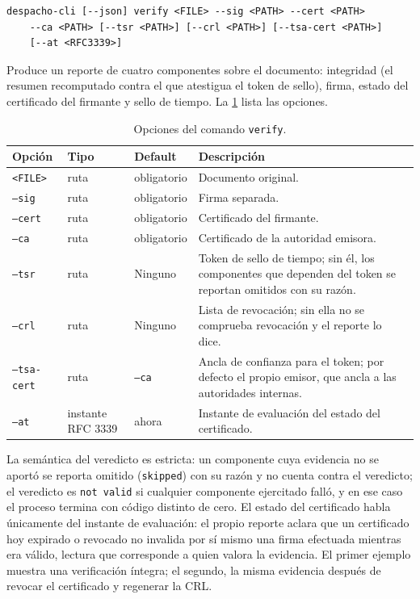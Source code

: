 \begin{lstlisting}[numbers=none]
despacho-cli [--json] verify <FILE> --sig <PATH> --cert <PATH>
    --ca <PATH> [--tsr <PATH>] [--crl <PATH>] [--tsa-cert <PATH>]
    [--at <RFC3339>]
\end{lstlisting}

Produce un reporte de cuatro componentes sobre el documento: integridad (el resumen recomputado contra el que atestigua el token de sello), firma, estado del certificado del firmante y sello de tiempo. La \cref{tab:cli-verify-opciones} lista las opciones.

\begin{table}[H]
  \centering
  \caption{Opciones del comando \texttt{verify}.}
  \label{tab:cli-verify-opciones}
  \begin{tabularx}{\linewidth}{@{}l l l >{\raggedright\arraybackslash}X@{}}
    \toprule
    \textbf{Opción} & \textbf{Tipo} & \textbf{Default} & \textbf{Descripción} \\
    \midrule
    \texttt{<FILE>} & ruta & obligatorio & Documento original. \\
    \texttt{--sig} & ruta & obligatorio & Firma separada. \\
    \texttt{--cert} & ruta & obligatorio & Certificado del firmante. \\
    \texttt{--ca} & ruta & obligatorio & Certificado de la autoridad emisora. \\
    \texttt{--tsr} & ruta & Ninguno & Token de sello de tiempo; sin él, los componentes que dependen del token se reportan omitidos con su razón. \\
    \texttt{--crl} & ruta & Ninguno & Lista de revocación; sin ella no se comprueba revocación y el reporte lo dice. \\
    \texttt{--tsa-cert} & ruta & \texttt{--ca} & Ancla de confianza para el token; por defecto el propio emisor, que ancla a las autoridades internas. \\
    \texttt{--at} & instante RFC 3339 & ahora & Instante de evaluación del estado del certificado. \\
    \bottomrule
  \end{tabularx}
\end{table}

La semántica del veredicto es estricta: un componente cuya evidencia no se aportó se reporta omitido (\texttt{skipped}) con su razón y no cuenta contra el veredicto; el veredicto es \texttt{not valid} si cualquier componente ejercitado falló, y en ese caso el proceso termina con código distinto de cero. El estado del certificado habla únicamente del instante de evaluación: el propio reporte aclara que un certificado hoy expirado o revocado no invalida por sí mismo una firma efectuada mientras era válido, lectura que corresponde a quien valora la evidencia. El primer ejemplo muestra una verificación íntegra; el segundo, la misma evidencia después de revocar el certificado y regenerar la CRL.

